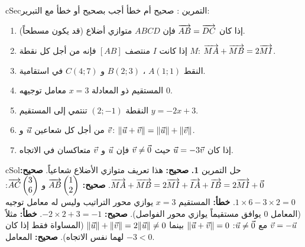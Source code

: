 \documentclass[12pt,a4paper]{article}
\newenvironment{BOX}[2]{\begin{otherlanguage}{english}\begin{arbox}{#1}{#2}}{\end{arbox}\end{otherlanguage}}
\newcounter{exo}
\newenvironment{tamrin}[1]{\stepcounter{exo}\begin{BOX}{cSec}{التمرين \theexo: #1}}{\end{BOX}}
\newenvironment{hal}{\Needspace{12\baselineskip}\begin{otherlanguage}{english}\begin{arbox}[breakable]{cSol}{حل التمرين \theexo}}{\end{arbox}\end{otherlanguage}}
\begin{document}
\begin{tamrin}{صحيح أم خطأ}
أجب بصحيح أو خطأ مع التبرير:
\begin{enumerate}
\item إذا كان $\V{AB}=\V{DC}$ فإن $ABCD$ متوازي أضلاع (قد يكون مسطحاً).
\item إذا كانت $I$ منتصف $[AB]$ فإنه من أجل كل نقطة $M$: $\V{MA}+\V{MB}=2\V{MI}$.
\item النقط $A(1;1)$ ، $B(2;3)$ و $C(4;7)$ في استقامية.
\item المستقيم ذو المعادلة $x=3$ معامل توجيهه $0$.
\item النقطة $(2;-1)$ تنتمي إلى المستقيم $y=-2x+3$.
\item من أجل كل شعاعين $\vu$ و $\vv$: $\|\vu+\vv\|=\|\vu\|+\|\vv\|$.
\item إذا كان $\vu=-3\vv$ حيث $\vv\ne\vec0$ فإن $\vu$ و $\vv$ متعاكسان في الاتجاه.
\end{enumerate}
\end{tamrin}
\begin{hal}
\textbf{1.} \textbf{صحيح:} هذا تعريف متوازي الأضلاع شعاعياً.
 \textbf{صحيح:} $\V{MA}+\V{MB}=2\V{MI}+\V{IA}+\V{IB}=2\V{MI}+\vec0$.
 \textbf{صحيح:} $\V{AB}\cp{1}{2}$ و $\V{AC}\cp{3}{6}$: $1\times6-3\times2=0$.
 \textbf{خطأ:} المستقيم $x=3$ يوازي محور التراتيب وليس له معامل توجيه (المعامل $0$ يوافق مستقيماً يوازي محور الفواصل).
 \textbf{صحيح:} $-2\times2+3=-1$.
 \textbf{خطأ:} مثلاً $\vv=-\vu$ مع $\vu\ne\vec0$: $\|\vu+\vv\|=0$ بينما $\|\vu\|+\|\vv\|=2\|\vu\|\ne0$ (المساواة فقط إذا كان لهما نفس الاتجاه).
 \textbf{صحيح:} المعامل $-3<0$.
\end{hal}
\end{document}
